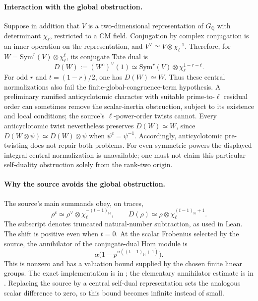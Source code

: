 \paragraph{Interaction with the global obstruction.}
Suppose in addition that $V$ is a two-dimensional representation of
$G_{\mathbb Q}$ with determinant $\chi_\ell$, restricted to a CM field.
Conjugation by complex conjugation is an inner operation on the
representation, and $V^\vee\simeq V\otimes\chi_\ell^{-1}$. Therefore, for
$W=\mathrm{Sym}^r(V)\otimes\chi_\ell^t$, its conjugate Tate dual is
\[
 D(W):=(W^c)^\vee(1)
       \simeq\mathrm{Sym}^r(V)\otimes\chi_\ell^{1-r-t}.
\]
For odd $r$ and $t=(1-r)/2$, one has $D(W)\simeq W$. Thus these central
normalizations also fail the finite-global-congruence-term hypothesis.
A preliminary ramified anticyclotomic character with suitable prime-to-$\ell$
residual order can sometimes remove the scalar-inertia obstruction,
subject to its existence and local conditions; the source's
$\ell$-power-order twists cannot. Every anticyclotomic twist nevertheless
preserves $D(W)\simeq W$, since
$D(W\otimes\psi)\simeq D(W)\otimes\psi$ when $\psi^c=\psi^{-1}$.
Accordingly, anticyclotomic pre-twisting does not repair both problems.
For even symmetric powers the displayed integral central normalization is
unavailable; one must not claim this particular self-duality obstruction
solely from the rank-two origin.

\paragraph{Why the source avoids the global obstruction.}
The source's main summands obey, on traces,
\[
 \rho^c\simeq\rho^\vee\otimes
       \chi_\ell^{-(t-1)_{\mathbb N}},\qquad
 D(\rho)\simeq\rho\otimes
       \chi_\ell^{(t-1)_{\mathbb N}+1}.
\]
The subscript denotes truncated natural-number subtraction, as used in
Lean. The shift is positive even when $t=0$. At the scalar Frobenius
selected by the source, the annihilator of the conjugate-dual Hom module
is
\[
 \alpha\bigl(1-p^{n((t-1)_{\mathbb N}+1)}\bigr).
\]
This is nonzero and has a valuation bound supplied by the chosen finite
linear groups. The exact implementation is
 in
; the elementary
annihilator estimate is  in
. Replacing the source by a central self-dual
representation sets the analogous scalar difference to zero, so this
bound becomes infinite instead of small.
